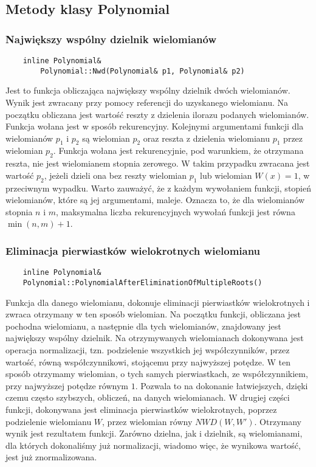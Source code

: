\documentclass[oneside,a4paper]{book}
\begin{document}
	\subsection{Metody klasy Polynomial}
	
	\subsubsection{Największy wspólny dzielnik wielomianów}
	\begin{lstlisting}
	inline Polynomial&
	    Polynomial::Nwd(Polynomial& p1, Polynomial& p2)
	\end{lstlisting}
	
	Jest to funkcja obliczająca największy wspólny dzielnik dwóch wielomianów. Wynik jest zwracany przy pomocy referencji do uzyskanego wielomianu. Na początku obliczana jest wartość reszty z dzielenia ilorazu podanych wielomianów. Funkcja wołana jest w sposób rekurencyjny. Kolejnymi argumentami funkcji dla wielomianów $p_1$ i $p_2$ są wielomian $p_2$ oraz reszta z dzielenia wielomianu $p_1$ przez wielomian $p_2$. Funkcja wołana jest rekurencyjnie, pod warunkiem, że otrzymana reszta, nie jest wielomianem stopnia zerowego. W takim przypadku zwracana jest wartość $p_2$, jeżeli dzieli ona bez reszty wielomian $p_1$ lub wielomian $W(x)=1$, w przeciwnym wypadku. Warto zauważyć, że z każdym wywołaniem funkcji, stopień wielomianów, które są jej argumentami, maleje. Oznacza to, że dla wielomianów stopnia $n$ i $m$, maksymalna liczba rekurencyjnych wywołań funkcji jest równa $\min(n,m)+1$.
	
	\subsubsection{Eliminacja pierwiastków wielokrotnych wielomianu}
	\begin{lstlisting}
	inline Polynomial&
	Polynomial::PolynomialAfterEliminationOfMultipleRoots()
	\end{lstlisting}
	
	Funkcja dla danego wielomianu, dokonuje eliminacji pierwiastków wielokrotnych i zwraca otrzymany w ten sposób wielomian. Na początku funkcji, obliczana jest pochodna wielomianu, a następnie dla tych wielomianów, znajdowany jest największy wspólny dzielnik. Na otrzymywanych wielomianach dokonywana jest operacja normalizacji, tzn. podzielenie wszystkich jej współczynników, przez wartość, równą współczynnikowi, stojącemu przy najwyższej potędze. W ten sposób otrzymamy wielomian, o tych samych pierwiastkach, ze współczynnikiem, przy najwyższej potędze równym $1$. Pozwala to na dokonanie łatwiejszych, dzięki czemu często szybszych, obliczeń, na danych wielomianach. W drugiej części funkcji, dokonywana jest eliminacja pierwiastków wielokrotnych, poprzez podzielenie wielomianu $W$, przez wielomian równy $NWD(W, W')$. Otrzymany wynik jest rezultatem funkcji. Zarówno dzielna, jak i dzielnik, są wielomianami, dla których dokonaliśmy już normalizacji, wiadomo więc, że wynikowa wartość, jest już znormalizowana.
	
\end{document}
